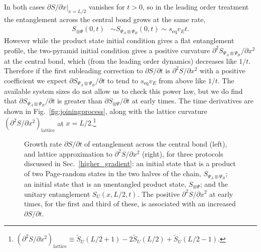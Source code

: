 \documentclass[aps,prx,twocolumn,superscriptaddress,floatfix,nofootinbib,prx]{revtex4}
\renewcommand{\>}{\right\rangle}
\newcommand{\<}{\left\langle}
\newcommand{\ba}{\begin{align}}
\newcommand{\seq}{s_\text{eq}}
\begin{document}
In both cases $\partial S/\partial x|_{x=L/2}$ vanishes for $t>0$, so in the leading order treatment the entanglement across the central bond grows at the same rate,
\ba
S_{\otimes \Psi}(0,t) & \sim 
S_{\Psi_A\otimes\Psi_B}(0,t)  \sim \seq v_E t.
\end{align}
However while the product state initial condition gives a flat entanglement profile, the two-pyramid initial condition gives a positive curvature $\partial^2S_{\Psi_A\otimes\Psi_B}/\partial x^2$ at the central bond, which (from the leading order dynamics) decreases like $1/t$. Therefore if the first subleading correction to $\partial S/\partial t$ is $\partial^2S/\partial x^2$ with a positive coefficient we  expect $\partial S_{\Psi_A\otimes\Psi_B}/\partial t$ to tend to $\seq v_E$ from above like $1/t$.
The available system sizes do not allow us to check this power law, but we do find that $\partial S_{\Psi_A\otimes\Psi_B}/\partial t$ is greater than $\partial S_{\otimes \Psi}/\partial t$ at early times. The time derivatives are shown in Fig.~\ref{fig:joiningprocess}, along with the lattice curvature
$(\partial^2 S/ \partial x^2)_\text{lattice}$ at $x=L/2$.\footnote{ $(\partial^2 S / \partial x^2)_\text{lattice}\equiv {\widetilde S_U(L/2+1) - 2 \widetilde S_U(L/2) + \widetilde S_U(L/2-1)}$.} 


\begin{figure}[t]
\caption{
Growth rate $\partial S/\partial t$ of entanglement across the central bond (left), 
and  lattice approximation to $\partial^2S/\partial x^2$ (right), for three protocols discussed in Sec.~\ref{higher_gradient}: an initial state that is a product of  two Page-random states in the two halves of the chain, $S_{\Psi_A\otimes\Psi_B}$; an initial state that is an unentangled product state, $S_{\otimes \Psi}$; and the unitary entanglement $S_U(x,L/2,t)$. The positive $\partial^2S/\partial x^2$ at early times, for the first and third of these, is associated with an increased $\partial S/\partial t$.
}  \label{fig:dSdt}
\end{figure}
\end{document}

